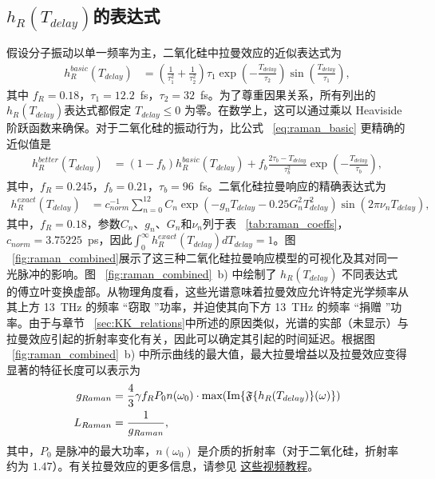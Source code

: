 \subsection{$h_R(T_{delay})$的表达式}
假设分子振动以单一频率为主，二氧化硅中拉曼效应的近似表达式为 
\begin{align}
\label{eq:raman_basic}
    h_R^{basic}(T_{delay})&= \left(\frac{1}{\tau_1^{2}}+\frac{1}{\tau_2^{2}} \right)\tau_1\exp\left(-\frac{T_{delay}}{\tau_2}\right)\sin\left(\frac{T_{delay}}{\tau_1}\right),
\end{align}
其中 $f_R=0.18$，$\tau_1=12.2$~fs，$\tau_2=32$~fs。为了尊重因果关系，所有列出的 $h_R(T_{delay})$表达式都假定 $T_{delay}\leq0$ 为零。在数学上，这可以通过乘以 Heaviside 阶跃函数来确保。对于二氧化硅的振动行为，比公式 ~\ref{eq:raman_basic} 更精确的近似值是  
\begin{align}
\label{eq:raman_new}
    h_R^{better}(T_{delay})&= (1-f_b) h_R^{basic}(T_{delay})+f_b\frac{2\tau_b-T_{delay}}{\tau_b^2}\exp\left(-\frac{T_{delay}}{\tau_b}\right),
\end{align}
其中，$f_R=0.245$，$f_b=0.21$，$\tau_b=96$~fs。二氧化硅拉曼响应的精确表达式为
\begin{align}
\label{eq:Raman_exact}
    h_R^{exact}(T_{delay})&=c^{-1}_{norm}\sum_{n=0}^{12}C_n\exp\left(- g_nT_{delay}-0.25G_n^2T^2_{delay}  \right)\sin\left(2\pi \nu_nT_{delay} \right),
\end{align}
其中，$f_R=0.18$，参数$C_n$、$g_n$、$G_n$和$\nu_n$列于表 ~\ref{tab:raman_coeffs}，$c_{norm}=3.75225$~ps，因此$\int_0^\infty h_R^{exact}(T_{delay}) dT_{delay}=1$。图 ~\ref{fig:raman_combined}展示了这三种二氧化硅拉曼响应模型的可视化及其对同一光脉冲的影响。图 ~\ref{fig:raman_combined}~b) 中绘制了 $h_R(T_{delay})$ 不同表达式的傅立叶变换虚部。从物理角度看，这些光谱意味着拉曼效应允许特定光学频率从其上方 13~THz 的频率 “窃取 ”功率，并迫使其向下方 13~THz 的频率 “捐赠 ”功率。由于与章节 ~\ref{sec:KK_relations}中所述的原因类似，光谱的实部（未显示）与拉曼效应引起的折射率变化有关，因此可以确定其引起的时间延迟。根据图 ~\ref{fig:raman_combined}~b) 中所示曲线的最大值，最大拉曼增益以及拉曼效应变得显著的特征长度可以表示为
\begin{align}
    g_{Raman} &= \frac{4}{3} \gamma f_R P_0 n(\omega_0)\cdot \text{max}( \text{Im} \{ \mathfrak{F} \{ h_R(T_{delay}) \}(\omega) \} )\\ 
    L_{Raman} &= \frac{1}{g_{Raman}},
\end{align}
其中，$P_0$ 是脉冲的最大功率，$n(\omega_0)$ 是介质的折射率（对于二氧化硅，折射率约为 $1.47$）。有关拉曼效应的更多信息，请参见 \href{https://www.youtube.com/playlist?list=PLdFybGSAoPnn6tnSmptR71zKAgcKsjIfi}{这些视频教程}。  
